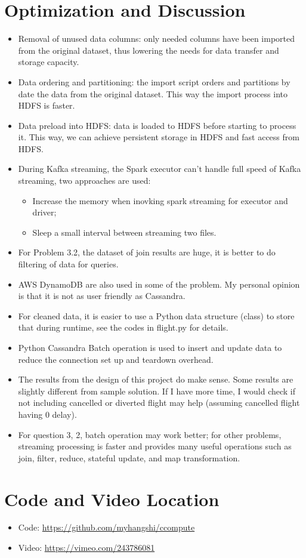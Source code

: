 \documentclass[fontsize=11pt,paper=a4]{scrartcl}
\begin{document}
\section{Optimization and Discussion}
\begin{itemize}
\item Removal of unused data columns: only needed columns have been imported from the original dataset, thus lowering the needs for data transfer and storage capacity.
\item Data ordering and partitioning: the import script orders and partitions by date the data from the original dataset. This way the import process into HDFS is faster.
\item Data preload into HDFS: data  is loaded to HDFS before starting to process it. This way, we can achieve persistent storage in HDFS and fast access from HDFS.
\item During Kafka streaming, the Spark executor can't handle full speed of Kafka streaming, two approaches are used: 
\begin{itemize}
\item Increase the memory when inovking spark streaming for executor and driver; 
\item Sleep a small interval between streaming two files. 
\end{itemize} 
\item For Problem 3.2, the dataset of join results are huge, it is better to do filtering of data for queries. 
\item AWS DynamoDB are also used in some of the problem. My personal opinion is that it is not as user friendly as Cassandra. 
\item For cleaned data, it is easier to use a Python data structure (class) to store that during runtime, see the codes in flight.py for details. 
\item Python Cassandra Batch operation is used to insert and update data to reduce the connection set up and teardown overhead. 
\item The results from the design of this project do make sense. Some results are slightly different from sample solution. If I have more time, I would check if not including cancelled or diverted flight may help (assuming cancelled flight having 0 delay). 
\item For question 3, 2, batch operation may work better; for other problems, streaming processing is faster and provides many useful operations such as join, filter, reduce, stateful update, and map transformation. 
\end{itemize} 
 
\section{Code and Video Location}
\begin{itemize}
\item Code:    \url{https://github.com/myhangshi/ccompute}
\item Video:   \url{https://vimeo.com/243786081}
\end{itemize} 
\end{document}
